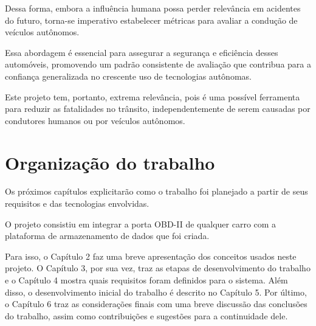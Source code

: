 Dessa forma, embora a influência humana possa perder relevância em acidentes do futuro, torna-se imperativo estabelecer métricas para avaliar a condução de veículos autônomos. 

Essa abordagem é essencial para assegurar a segurança e eficiência desses automóveis, promovendo um padrão consistente de avaliação que contribua para a confiança generalizada no crescente uso de tecnologias autônomas.

Este projeto tem, portanto, extrema relevância, pois é uma possível ferramenta para reduzir as fatalidades no trânsito, independentemente de serem causadas por condutores humanos ou por veículos autônomos.

\section{Organização do trabalho}
Os próximos capítulos explicitarão como o trabalho foi planejado a partir de seus requisitos e das tecnologias envolvidas.

O projeto consistiu em integrar a porta OBD-II de qualquer carro com a plataforma de armazenamento de dados que foi criada.

Para isso, o Capítulo 2 faz uma breve apresentação dos conceitos usados neste projeto. O Capítulo 3, por sua vez, traz as etapas de desenvolvimento do trabalho e o Capítulo 4 mostra quais requisitos foram definidos para o sistema. Além disso, o desenvolvimento inicial do trabalho é descrito no Capítulo 5. Por último, o Capítulo 6 traz as considerações finais com uma breve discussão das conclusões do trabalho, assim como contribuições e sugestões para a continuidade dele.